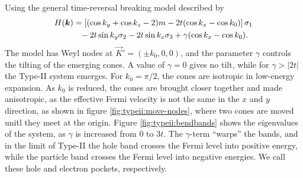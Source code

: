 Using the general time-reversal breaking model described by \textcite{mccormickMinimalModelsTopological2017}
\begin{equation}
  \begin{split}
    H(\vec{k}) &= \left[ ( \cos k_y + \cos k_z - 2 )m - 2 t (\cos k_x - \cos k_0) \right] \sigma_1\\
    &\pe - 2 t \sin k_y \sigma_2 - 2t \sin k_z \sigma_3
    + \gamma (\cos k_x - \cos k_0).
  \end{split}
\end{equation}
The model has Weyl nodes at \(\vec{K}' = (\pm k_{0}, 0,0)\), and the parameter $\gamma$ controls the tilting of the emerging cones.
A value of $\gamma=0$ gives no tilt, while for $\gamma > |2 t|$ the Type-II system emerges.
For \( k_0 = \pi /2 \), the cones are isotropic in low-energy expansion.
As \( k_0 \) is reduced, the cones are brought closer together and made anisotropic, as the effective Fermi velocity is not the same in the \( x \) and \( y \) direction, as shown in figure \ref{fig:typeii:move-nodes}, where two cones are moved unitl they meet at the origin.
Figure \ref{fig:typeii:bendbands} shows the eigenvalues of the system, as \( \gamma \) is increased from 0 to \( 3t \).
The \(\gamma\)-term ``warps'' the bands, and in the limit of Type-II the hole band crosses the Fermi level into positive energy, while the particle band crosses the Fermi level into negative energies.
We call these hole and electron pockets, respectively.

